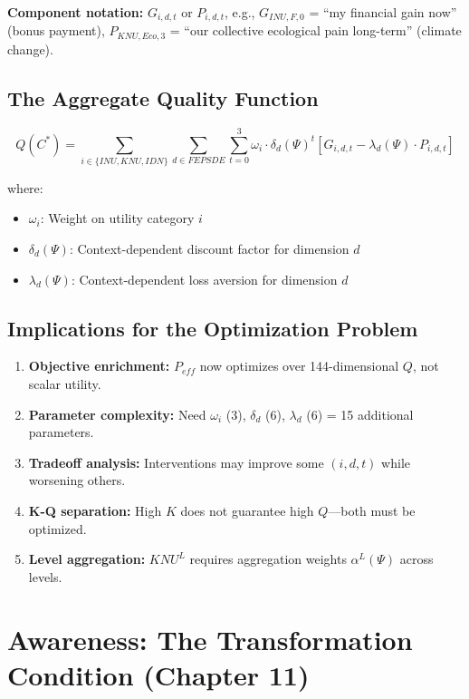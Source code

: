 \textbf{Component notation:} $G_{i,d,t}$ or $P_{i,d,t}$, e.g., $G_{INU,F,0}$ = ``my financial gain now'' (bonus payment), $P_{KNU,Eco,3}$ = ``our collective ecological pain long-term'' (climate change).

\subsection{The Aggregate Quality Function}

\begin{equation}
\boxed{
Q(C^*) = \sum_{i \in \{INU, KNU, IDN\}} \sum_{d \in FEPSDE} \sum_{t=0}^{3}
         \omega_i \cdot \delta_d(\Psi)^t \left[ G_{i,d,t} - \lambda_d(\Psi) \cdot P_{i,d,t} \right]
}
\label{eq:mp-quality-function}
\end{equation}

where:
\begin{itemize}[nosep]
\item $\omega_i$: Weight on utility category $i$
\item $\delta_d(\Psi)$: Context-dependent discount factor for dimension $d$
\item $\lambda_d(\Psi)$: Context-dependent loss aversion for dimension $d$
\end{itemize}

\subsection{Implications for the Optimization Problem}

\begin{enumerate}[nosep]
\item \textbf{Objective enrichment:} $P_{eff}$ now optimizes over 144-dimensional $Q$, not scalar utility.
\item \textbf{Parameter complexity:} Need $\omega_i$ (3), $\delta_d$ (6), $\lambda_d$ (6) = 15 additional parameters.
\item \textbf{Tradeoff analysis:} Interventions may improve some $(i, d, t)$ while worsening others.
\item \textbf{K-Q separation:} High $K$ does not guarantee high $Q$---both must be optimized.
\item \textbf{Level aggregation:} $KNU^L$ requires aggregation weights $\alpha^L(\Psi)$ across levels.
\end{enumerate}

\section{Awareness: The Transformation Condition (Chapter 11)}
\label{sec:mp-awareness}

